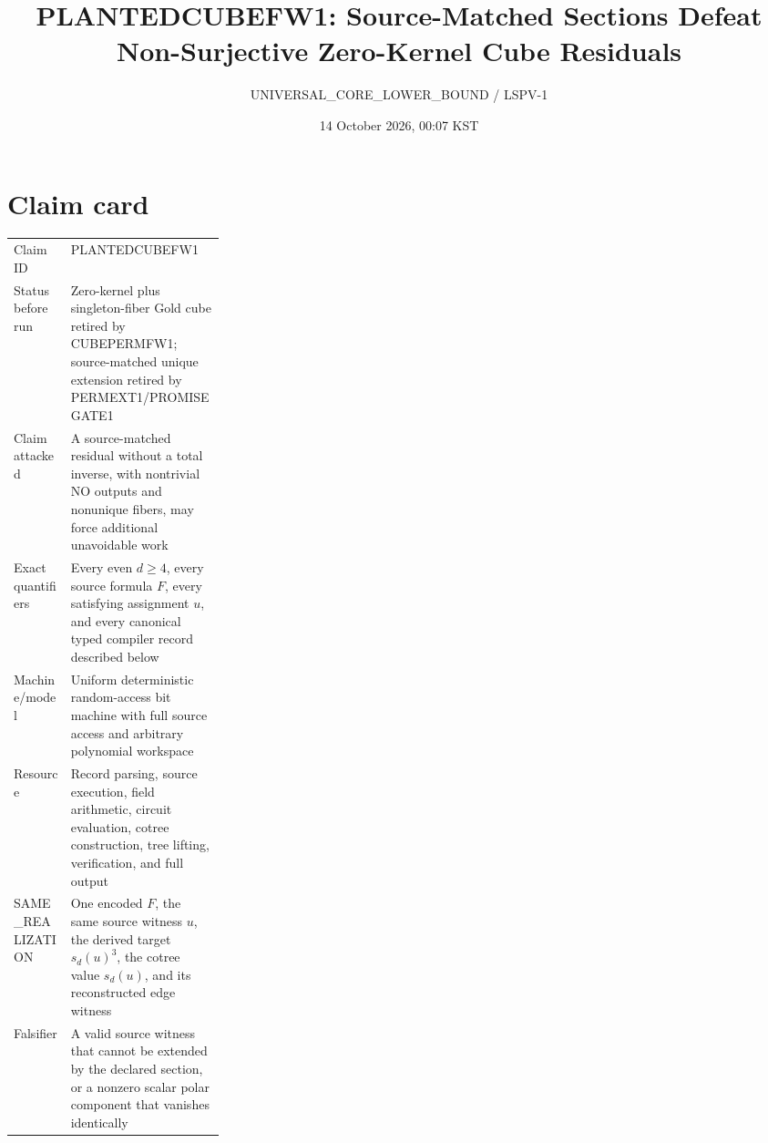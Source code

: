 \documentclass[11pt]{article}
\title{PLANTEDCUBEFW1: Source-Matched Sections Defeat\\Non-Surjective Zero-Kernel Cube Residuals}
\author{UNIVERSAL\_CORE\_LOWER\_BOUND / LSPV-1}
\date{14 October 2026, 00:07 KST}
\begin{document}
\maketitle

\begin{center}
\end{center}

\section{Claim card}
\begin{tabularx}{\linewidth}{p{0.27\linewidth}X}
\toprule
Claim ID & PLANTEDCUBEFW1 \\
Status before run & Zero-kernel plus singleton-fiber Gold cube retired by CUBEPERMFW1; source-matched unique extension retired by PERMEXT1/PROMISEGATE1 \\
Claim attacked & A source-matched residual without a total inverse, with nontrivial NO outputs and nonunique fibers, may force additional unavoidable work \\
Exact quantifiers & Every even $d\ge4$, every source formula $F$, every satisfying assignment $u$, and every canonical typed compiler record described below \\
Machine/model & Uniform deterministic random-access bit machine with full source access and arbitrary polynomial workspace \\
Resource & Record parsing, source execution, field arithmetic, circuit evaluation, cotree construction, tree lifting, verification, and full output \\
SAME\_REALIZATION & One encoded $F$, the same source witness $u$, the derived target $s_d(u)^3$, the cotree value $s_d(u)$, and its reconstructed edge witness \\
Falsifier & A valid source witness that cannot be extended by the declared section, or a nonzero scalar polar component that vanishes identically \\
\bottomrule
\end{tabularx}
\end{document}

